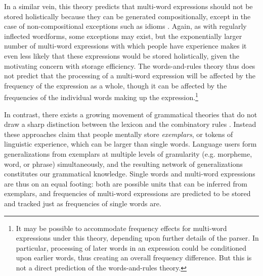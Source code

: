 \documentclass[authoryear]{elsarticle}
\begin{document}
In a similar vein, this theory predicts that multi-word expressions should not be stored holistically because they can be generated compositionally, except in the case of non-compositional exceptions such as idioms \citep{Swinney:1979wv}. Again, as with regularly inflected wordforms, some exceptions may exist, but the exponentially larger number of multi-word expressions with which people have experience makes it even less likely that these expressions would be stored holistically, given the motivating concern with storage efficiency. The words-and-rules theory thus does not predict that the processing of a multi-word expression will be affected by the frequency of the expression as a whole, though it can be affected by the frequencies of the individual words making up the expression.\footnote{It may be possible to accommodate frequency effects for multi-word expressions under this theory, depending upon further details of the parser. In particular, processing of later words in an expression could be conditioned upon earlier words, thus creating an overall frequency difference. But this is not a direct prediction of the words-and-rules theory.}


In contrast, there exists a growing movement of grammatical theories that do not draw a sharp distinction between the lexicon and the combinatory rules \citep[e.g.][]{Langacker:1987wg,Johnson:1997tf,Johnson:2006ii,Bybee:2003wl, Bybee:2006ul, Goldberg:2003bv,Gahl:is}. Instead these approaches claim that people mentally store \emph{exemplars}, or tokens of linguistic experience, which can be larger than single words. Language users form generalizations from exemplars at multiple levels of granularity (e.g. morpheme, word, or phrase) simultaneously, and the resulting network of generalizations constitutes our grammatical knowledge. Single words and multi-word expressions are thus on an equal footing: both are possible units that can be inferred from exemplars, and frequencies of multi-word expressions are predicted to be stored and tracked just as frequencies of single words are.
\end{document}
